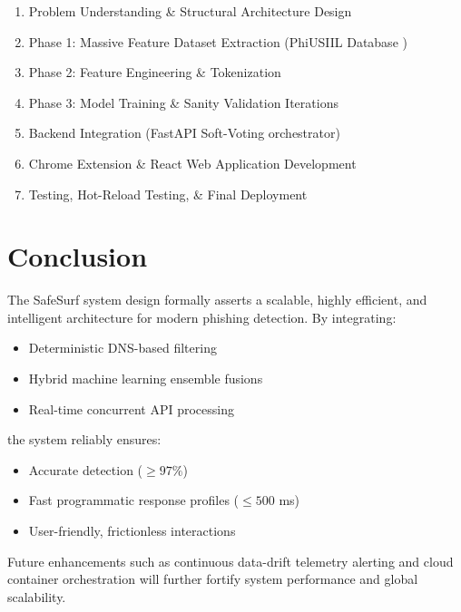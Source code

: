 \begin{enumerate}
    \item Problem Understanding \& Structural Architecture Design
    \item Phase 1: Massive Feature Dataset Extraction (PhiUSIIL Database \cite{ref5})
    \item Phase 2: Feature Engineering \& Tokenization
    \item Phase 3: Model Training \& Sanity Validation Iterations
    \item Backend Integration (FastAPI Soft-Voting orchestrator)
    \item Chrome Extension \& React Web Application Development
    \item Testing, Hot-Reload Testing, \& Final Deployment
\end{enumerate}

\section{Conclusion}
\noindent
The SafeSurf system design formally asserts a scalable, highly efficient, and intelligent architecture for modern phishing detection.
\noindent
By integrating:

\begin{itemize}
    \item Deterministic DNS-based filtering
    \item Hybrid machine learning ensemble fusions
    \item Real-time concurrent API processing
\end{itemize}
\noindent
the system reliably ensures:

\begin{itemize}
    \item Accurate detection ($\geq 97\%$)
    \item Fast programmatic response profiles ($\leq 500$ ms)
    \item User-friendly, frictionless interactions
\end{itemize}
\noindent
Future enhancements such as continuous data-drift telemetry alerting and cloud container orchestration \cite{ref14} will further fortify system performance and global scalability.
